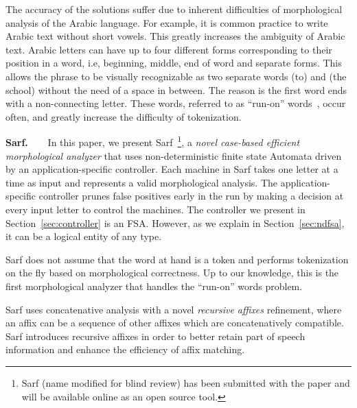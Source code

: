 \documentclass[11pt]{article}
\begin{document}
\novocalize
The accuracy of the solutions suffer due to inherent difficulties
of morphological analysis of the Arabic language. 
For example, it is common practice to write Arabic text
without short vowels. 
This greatly increases the ambiguity of Arabic text. 
Arabic letters can have up to %
four different forms
corresponding to their position in a word, i.e, beginning,
middle, end of word and separate forms. 
This allows the phrase \transfalse
{} \transtrue
to be visually recognizable
as two separate words  (to) and  (the school) 
without the need of a space in between. 
The reason is the first word  ends with
 a non-connecting letter. 
These words,
referred to as ``run-on'' words~\cite{Buckwalter:04},
occur often, and greatly increase the
difficulty of tokenization.

{\bf Sarf.~~~}
In this paper, we present Sarf~\footnote{Sarf (name modified for blind review) 
has been submitted with the paper and will be available online as an open source tool.},
 a {\em novel case-based efficient
morphological analyzer} that uses 
non-deterministic finite state Automata 
driven by an application-specific controller.
Each machine in Sarf takes one letter at a time as input
and represents a valid morphological analysis.
The application-specific controller prunes false positives
early in the run by making a decision at every input letter
to control the machines.
The controller we present in Section~\ref{sec:controller}
is an FSA. However, as we explain in Section~\ref{sec:ndfsa},
it can be a logical entity of any type. 

Sarf does not assume that the word at hand is a token and
performs tokenization on the fly based on morphological correctness.
Up to our knowledge, this is the first morphological analyzer that 
handles the ``run-on'' words problem. 

Sarf uses concatenative analysis with a novel 
{\em recursive affixes} refinement,
where an affix can be a sequence of other affixes which are concatenatively compatible.
Sarf introduces recursive affixes in order to
better retain part of speech information and enhance the 
efficiency of affix matching. 
\end{document}
